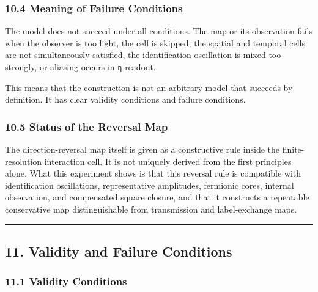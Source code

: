 \documentclass[
  a4paper,
]{article}
\begin{document}
\subsubsection{10.4 Meaning of Failure
Conditions}\label{meaning-of-failure-conditions}

The model does not succeed under all conditions. The map or its
observation fails when the observer is too light, the cell is skipped,
the spatial and temporal cells are not simultaneously satisfied, the
identification oscillation is mixed too strongly, or aliasing occurs in
\texttt{η} readout.

This means that the construction is not an arbitrary model that succeeds
by definition. It has clear validity conditions and failure conditions.

\subsubsection{10.5 Status of the Reversal
Map}\label{status-of-the-reversal-map}

The direction-reversal map itself is given as a constructive rule inside
the finite-resolution interaction cell. It is not uniquely derived from
the first principles alone. What this experiment shows is that this
reversal rule is compatible with identification oscillations,
representative amplitudes, fermionic cores, internal observation, and
compensated square closure, and that it constructs a repeatable
conservative map distinguishable from transmission and label-exchange
maps.

\begin{center}\rule{0.5\linewidth}{0.5pt}\end{center}

\subsection{11. Validity and Failure
Conditions}\label{validity-and-failure-conditions}

\subsubsection{11.1 Validity Conditions}\label{validity-conditions}
\end{document}
